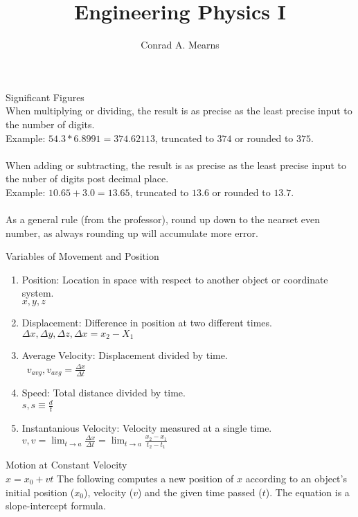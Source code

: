 \documentclass{article}
\title{Engineering Physics I}
\author{Conrad A. Mearns}
\begin{document}
\maketitle

\noindent
\Large
Significant Figures\\
\normalsize
\noindent
When multiplying or dividing, the result is as precise as the least precise input to the number of digits.\\
Example: $54.3 * 6.8991 = 374.62113$, truncated to $374$ or rounded to $375$.\\\\

\noindent
When adding or subtracting, the result is as precise as the least precise input to the nuber of digits post decimal place.\\
Example: $10.65 + 3.0 = 13.65$, truncated to $13.6$ or rounded to $13.7$.\\\\

\noindent
As a general rule (from the professor), round up down to the nearset even number, as always rounding up will accumulate more error.

\noindent
\Large
Variables of Movement and Position\\
\normalsize

\begin{enumerate}
  \item Position: Location in space with respect to another object or coordinate system.\\
    $x, y, z$
  \item Displacement: Difference in position at two different times.\\
    $\Delta x, \Delta y, \Delta z, \Delta x = x_2 - X_1$
  \item Average Velocity: Displacement divided by time.\\\
    $v_{avg}, v_{avg} = \frac{\Delta x}{\Delta t}$
  \item Speed: Total distance divided by time.\\
    $s, s \equiv \frac{d}{t}$
  \item Instantanious Velocity: Velocity measured at a single time.\\
    $v, v = \lim_{t \to a}\frac{\Delta x}{\Delta t} = \lim_{t \to a}\frac{x_2 - x_1}{t_2 - t_1}$
\end{enumerate}

\noindent
\Large
Motion at Constant Velocity\\
\normalsize
\noindent
$x = x_0 + vt$
The following computes a new position of $x$ according to an object's initial position ($x_0$), velocity ($v$) and the given time passed ($t$). The equation is a slope-intercept formula.
\end{document}
